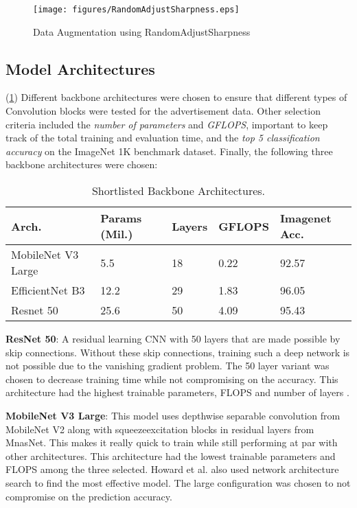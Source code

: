 \documentclass[conference]{IEEEtran}
\begin{document}
\begin{figure}[htbp] 
    \texttt{[image: figures/RandomAdjustSharpness.eps]} 
    \caption{Data Augmentation using RandomAdjustSharpness} 
    \label{fig} 
    \end{figure}
    


\subsection{Model Architectures} (\ref{tab:selArch})
Different backbone architectures were chosen to ensure that different types of 
Convolution blocks were tested for the advertisement data. Other selection criteria included
 the \textit{number of parameters} and \textit{GFLOPS}, important to keep track of the total training and evaluation time, 
 and the \textit{top 5 classification accuracy} on the ImageNet 1K benchmark dataset. Finally, the following three
 backbone architectures were chosen:

 \begin{table}[htbp]
    \caption{Shortlisted Backbone Architectures.}
    \centering
    \begin{tabular}{p{1.5cm}|p{1cm}|p{1cm}|p{1.2cm}|p{1cm}}
    \hline
    Arch. & Params (Mil.) & Layers & GFLOPS & Imagenet Acc.\\
    \hline
    MobileNet V3 Large & 5.5 & 18 & 0.22 & 92.57\\
    \hline
    EfficientNet B3 & 12.2 & 29 & 1.83 & 96.05\\
    \hline
    Resnet 50 & 25.6 & 50 & 4.09 & 95.43\\
    \hline
    \end{tabular}
    \label{tab:selArch}
  \end{table}

\textbf{ResNet 50}: A residual learning CNN with 50 layers that 
are made possible by skip connections. Without these skip 
connections, training such a deep network is not possible due 
to the vanishing gradient problem. The 50 layer variant was 
chosen to decrease training time while not compromising on the 
accuracy. This architecture had the highest trainable parameters,
 FLOPS and number of layers \cite{b18}.

\textbf{MobileNet V3 Large}: This model uses depthwise separable convolution 
from MobileNet V2 along with squeezeexcitation blocks in residual layers 
from MnasNet. This makes it really quick to train while still performing at
par with other architectures. This architecture had the lowest trainable 
parameters and FLOPS among the three selected. Howard et al. \cite{b19} 
also used network architecture search to find the most effective model. 
The large configuration was chosen to not compromise on the prediction accuracy.
\end{document}
